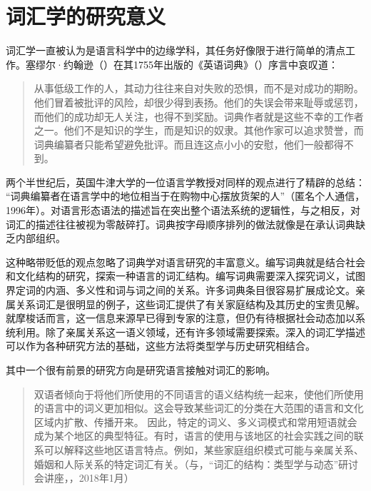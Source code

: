 \section{词汇学的研究意义}
\label{sec:recherche}

词汇学一直被认为是语言科学中的边缘学科，其任务好像限于进行简单的清点工作。塞缪尔·约翰逊（）在其1755年出版的《英语词典》（）序言中哀叹道：

\begin{quotation}
    从事低级工作的人，其动力往往来自对失败的恐惧，而不是对成功的期盼。他们冒着被批评的风险，却很少得到表扬。他们的失误会带来耻辱或惩罚，而他们的成功却无人关注，也得不到奖励。词典作者就是这些不幸的工作者之一。他们不是知识的学生，而是知识的奴隶。其他作家可以追求赞誉，而词典编纂者只能希望避免批评。而且连这点小小的安慰，他们一般都得不到。
\end{quotation}

两个半世纪后，英国牛津大学的一位语言学教授对同样的观点进行了精辟的总结： “词典编纂者在语言学中的地位相当于在购物中心摆放货架的人”（匿名个人通信，1996年）。对语言形态语法的描述旨在突出整个语法系统的逻辑性，与之相反，对词汇的描述往往被视为零敲碎打。词典按字母顺序排列的做法就像是在承认词典缺乏内部组织。

这种略带贬低的观点忽略了词典学对语言研究的丰富意义。编写词典就是结合社会和文化结构的研究，探索一种语言的词汇结构。编写词典需要深入探究词义，试图界定词的内涵、多义性和词与词之间的关系。许多词典条目很容易扩展成论文。亲属关系词汇是很明显的例子，这些词汇提供了有关家庭结构及其历史的宝贵见解。就摩梭话而言，这一信息来源早已得到专家的注意\parencite{fu1983}，但仍有待根据社会动态加以系统利用\parencite{milan2021entraide}。除了亲属关系这一语义领域，还有许多领域需要探索。深入的词汇学描述可以作为各种研究方法的基础，这些方法将类型学与历史研究相结合。

其中一个很有前景的研究方向是研究语言接触对词汇的影响。

\begin{quotation}
    双语者倾向于将他们所使用的不同语言的语义结构统一起来，使他们所使用的语言中的词义更加相似。这会导致某些词汇的分类在大范围的语言和文化区域内扩散、传播开来。
    因此，特定的词义、多义词模式和常用短语就会成为某个地区的典型特征。有时，语言的使用与该地区的社会实践之间的联系可以解释这些地区语言特点。例如，某些家庭组织模式可能与亲属关系、婚姻和人际关系的特定词汇有关。（与，“词汇的结构：类型学与动态”研讨会讲座，，2018年1月）
\end{quotation}

